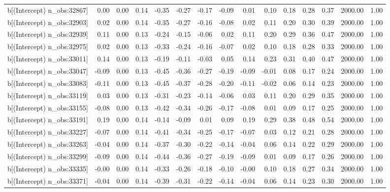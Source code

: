 \begin{table}[ht]
\begin{tabular}{rrrrrrrrrrrrrrr}
  b[(Intercept) n\_obs:32867] & 0.00 & 0.00 & 0.14 & -0.35 & -0.27 & -0.17 & -0.09 & 0.01 & 0.10 & 0.18 & 0.28 & 0.37 & 2000.00 & 1.00 \\ 
  b[(Intercept) n\_obs:32903] & 0.02 & 0.00 & 0.14 & -0.35 & -0.27 & -0.16 & -0.08 & 0.02 & 0.11 & 0.20 & 0.30 & 0.39 & 2000.00 & 1.00 \\ 
  b[(Intercept) n\_obs:32939] & 0.11 & 0.00 & 0.13 & -0.24 & -0.15 & -0.06 & 0.02 & 0.11 & 0.20 & 0.29 & 0.36 & 0.47 & 2000.00 & 1.00 \\ 
  b[(Intercept) n\_obs:32975] & 0.02 & 0.00 & 0.13 & -0.33 & -0.24 & -0.16 & -0.07 & 0.02 & 0.10 & 0.18 & 0.28 & 0.33 & 2000.00 & 1.00 \\ 
  b[(Intercept) n\_obs:33011] & 0.14 & 0.00 & 0.13 & -0.19 & -0.11 & -0.03 & 0.05 & 0.14 & 0.23 & 0.31 & 0.40 & 0.47 & 2000.00 & 1.00 \\ 
  b[(Intercept) n\_obs:33047] & -0.09 & 0.00 & 0.13 & -0.45 & -0.36 & -0.27 & -0.19 & -0.09 & -0.01 & 0.08 & 0.17 & 0.24 & 2000.00 & 1.00 \\ 
  b[(Intercept) n\_obs:33083] & -0.11 & 0.00 & 0.13 & -0.45 & -0.37 & -0.28 & -0.20 & -0.11 & -0.02 & 0.06 & 0.14 & 0.23 & 2000.00 & 1.00 \\ 
  b[(Intercept) n\_obs:33119] & 0.03 & 0.00 & 0.13 & -0.31 & -0.23 & -0.14 & -0.06 & 0.03 & 0.11 & 0.20 & 0.29 & 0.35 & 2000.00 & 1.00 \\ 
  b[(Intercept) n\_obs:33155] & -0.08 & 0.00 & 0.13 & -0.42 & -0.34 & -0.26 & -0.17 & -0.08 & 0.01 & 0.09 & 0.17 & 0.25 & 2000.00 & 1.00 \\ 
  b[(Intercept) n\_obs:33191] & 0.19 & 0.00 & 0.14 & -0.14 & -0.09 & 0.01 & 0.09 & 0.19 & 0.29 & 0.38 & 0.48 & 0.54 & 2000.00 & 1.00 \\ 
  b[(Intercept) n\_obs:33227] & -0.07 & 0.00 & 0.14 & -0.41 & -0.34 & -0.25 & -0.17 & -0.07 & 0.03 & 0.12 & 0.21 & 0.28 & 2000.00 & 1.00 \\ 
  b[(Intercept) n\_obs:33263] & -0.04 & 0.00 & 0.14 & -0.37 & -0.30 & -0.22 & -0.14 & -0.04 & 0.06 & 0.14 & 0.22 & 0.29 & 2000.00 & 1.00 \\ 
  b[(Intercept) n\_obs:33299] & -0.09 & 0.00 & 0.14 & -0.44 & -0.36 & -0.27 & -0.19 & -0.09 & 0.01 & 0.09 & 0.17 & 0.26 & 2000.00 & 1.00 \\ 
  b[(Intercept) n\_obs:33335] & -0.00 & 0.00 & 0.14 & -0.33 & -0.26 & -0.18 & -0.10 & -0.00 & 0.10 & 0.18 & 0.27 & 0.34 & 2000.00 & 1.00 \\ 
  b[(Intercept) n\_obs:33371] & -0.04 & 0.00 & 0.14 & -0.39 & -0.31 & -0.22 & -0.14 & -0.04 & 0.06 & 0.14 & 0.23 & 0.30 & 2000.00 & 1.00 \\ 

\end{tabular}
\end{table}
